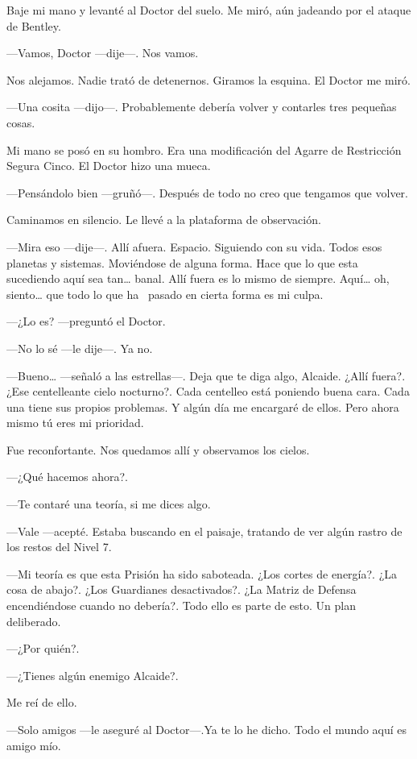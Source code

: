 Baje mi mano y levanté al Doctor del suelo. Me miró, aún jadeando por el
ataque de Bentley.

---Vamos, Doctor ---dije---. Nos vamos.

Nos alejamos. Nadie trató de detenernos. Giramos la esquina. El Doctor
me miró.

---Una cosita ---dijo---. Probablemente debería volver y contarles tres
pequeñas cosas.

Mi mano se posó en su hombro. Era una modificación del Agarre de
Restricción Segura Cinco. El Doctor hizo una mueca.

---Pensándolo bien ---gruñó---. Después de todo no creo que tengamos que
volver.

Caminamos en silencio. Le llevé a la plataforma de observación.

---Mira eso ---dije---. Allí afuera. Espacio. Siguiendo con su vida.
Todos esos planetas y sistemas. Moviéndose de alguna forma. Hace que lo
que esta sucediendo aquí sea tan\ldots{} banal. Allí fuera es lo mismo
de siempre. Aquí\ldots{} oh, siento\ldots{} que todo lo que ha ~pasado
en cierta forma es mi culpa.

---¿Lo es? ---preguntó el Doctor.

---No lo sé ---le dije---. Ya no.

---Bueno\ldots{} ---señaló a las estrellas---. Deja que te diga algo,
Alcaide. ¿Allí fuera?. ¿Ese centelleante cielo nocturno?. Cada centelleo
está poniendo buena cara. Cada una tiene sus propios problemas. Y algún
día me encargaré de ellos. Pero ahora mismo tú eres mi prioridad.

Fue reconfortante. Nos quedamos allí y observamos los cielos.

---¿Qué hacemos ahora?.

---Te contaré una teoría, si me dices algo.

---Vale ---acepté. Estaba buscando en el paisaje, tratando de ver algún
rastro de los restos del Nivel 7.

---Mi teoría es que esta Prisión ha sido saboteada. ¿Los cortes de
energía?. ¿La cosa de abajo?. ¿Los Guardianes desactivados?. ¿La Matriz
de Defensa encendiéndose cuando no debería?. Todo ello es parte de esto.
Un plan deliberado.

---¿Por quién?.

---¿Tienes algún enemigo Alcaide?.

Me reí de ello.

---Solo amigos ---le aseguré al Doctor---.Ya te lo he dicho. Todo el
mundo aquí es amigo mío.

